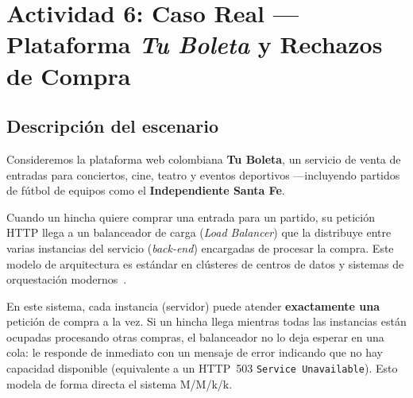 
\section{Actividad 6: Caso Real --- Plataforma \emph{Tu Boleta} y Rechazos de Compra}

\subsection*{Descripción del escenario}

Consideremos la plataforma web colombiana \textbf{Tu Boleta}, un servicio de venta de
entradas para conciertos, cine, teatro y eventos deportivos ---incluyendo partidos de
fútbol de equipos como el \textbf{Independiente Santa Fe}.

Cuando un hincha quiere comprar una entrada para un partido, su petición HTTP llega a un
balanceador de carga (\textit{Load Balancer}) que la distribuye entre varias instancias
del servicio (\textit{back-end}) encargadas de procesar la compra. Este modelo de arquitectura es estándar en clústeres de centros de datos y sistemas de orquestación modernos~\cite{greenberg2008, burns2016}.

En este sistema, cada instancia (servidor) puede atender \textbf{exactamente una} petición
de compra a la vez. Si un hincha llega mientras todas las instancias están ocupadas
procesando otras compras, el balanceador no lo deja esperar en una cola: le responde de
inmediato con un mensaje de error indicando que no hay capacidad disponible (equivalente
a un HTTP~503 \texttt{Service Unavailable}). Esto modela de forma directa el sistema
M/M/k/k.

